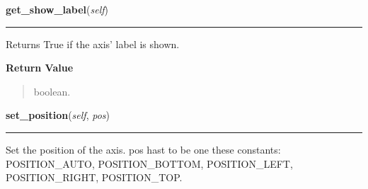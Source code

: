     \label{pygtk_chart:line_chart:Axis:get_show_label}

    \vspace{0.5ex}

\hspace{.8\funcindent}\begin{boxedminipage}{\funcwidth}

    \raggedright \textbf{get\_show\_label}(\textit{self})

    \vspace{-1.5ex}

    \rule{\textwidth}{0.5\fboxrule}
\setlength{\parskip}{2ex}
    Returns True if the axis' label is shown.

\setlength{\parskip}{1ex}
      \textbf{Return Value}
    \vspace{-1ex}

      \begin{quote}
      boolean.

      \end{quote}

    \end{boxedminipage}

    \label{pygtk_chart:line_chart:Axis:set_position}

    \vspace{0.5ex}

\hspace{.8\funcindent}\begin{boxedminipage}{\funcwidth}

    \raggedright \textbf{set\_position}(\textit{self}, \textit{pos})

    \vspace{-1.5ex}

    \rule{\textwidth}{0.5\fboxrule}
\setlength{\parskip}{2ex}
    Set the position of the axis. pos hast to be one these constants: 
    POSITION\_AUTO, POSITION\_BOTTOM, POSITION\_LEFT, POSITION\_RIGHT, 
    POSITION\_TOP.

\setlength{\parskip}{1ex}
    \end{boxedminipage}

    \label{pygtk_chart:line_chart:Axis:get_position}

